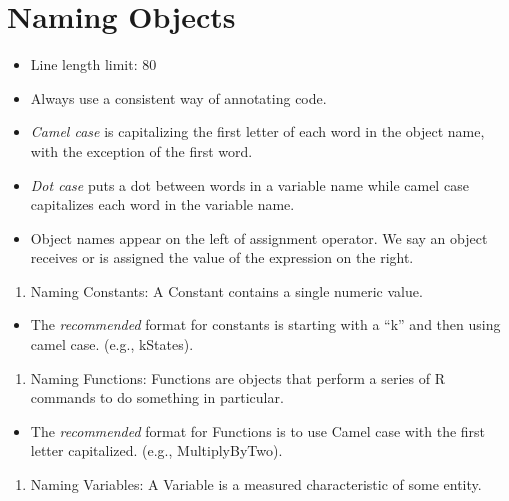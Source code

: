 \documentclass[
  letterpaper,
  DIV=11,
  numbers=noendperiod]{scrreprt}
\providecommand{\tightlist}{%
  \setlength{\itemsep}{0pt}\setlength{\parskip}{0pt}}\usepackage{longtable,booktabs,array}
\begin{document}
\section{Naming Objects}\label{naming-objects}

\begin{itemize}
\tightlist
\item
  Line length limit: 80
\item
  Always use a consistent way of annotating code.
\item
  \emph{Camel case} is capitalizing the first letter of each word in the
  object name, with the exception of the first word.
\item
  \emph{Dot case} puts a dot between words in a variable name while
  camel case capitalizes each word in the variable name.
\item
  Object names appear on the left of assignment operator. We say an
  object receives or is assigned the value of the expression on the
  right.
\end{itemize}

\begin{enumerate}
\def\labelenumi{\arabic{enumi}.}
\tightlist
\item
  Naming Constants: A Constant contains a single numeric value.
\end{enumerate}

\begin{itemize}
\tightlist
\item
  The \emph{recommended} format for constants is starting with a ``k''
  and then using camel case. (e.g., kStates).
\end{itemize}

\begin{enumerate}
\def\labelenumi{\arabic{enumi}.}
\setcounter{enumi}{1}
\tightlist
\item
  Naming Functions: Functions are objects that perform a series of R
  commands to do something in particular.
\end{enumerate}

\begin{itemize}
\tightlist
\item
  The \emph{recommended} format for Functions is to use Camel case with
  the first letter capitalized. (e.g., MultiplyByTwo).
\end{itemize}

\begin{enumerate}
\def\labelenumi{\arabic{enumi}.}
\setcounter{enumi}{2}
\tightlist
\item
  Naming Variables: A Variable is a measured characteristic of some
  entity.
\end{enumerate}
\end{document}
